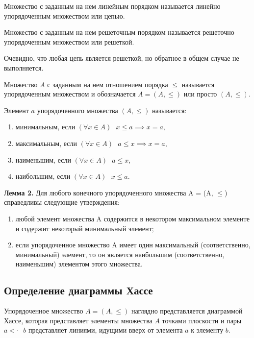 \documentclass[spec, och, labwork]{shiza}
\begin{document}
        Множество с заданным на нем линейным порядком называется линейно упорядоченным множеством или цепью.

        Множество с заданным на нем решеточным порядком называется решеточно упорядоченным множеством или решеткой.

        Очевидно, что любая цепь является решеткой, но обратное в общем случае не выполняется. 

        Множество $A$ с заданным на нем отношением порядка $\leq$ называется упорядоченным множеством и обозначается $A
        = (A, \leq)$ или просто $(A, \leq)$.

        Элемент $a$ упорядоченного множества $(A, \leq)$ называется:

        \begin{enumerate}
            \item минимальным, если $(\forall x \in A) \text{ } x \leq a \implies x = a$,
            \item максимальным, если $(\forall x \in A) \text{ } a \leq x \implies x = a$,
            \item наименьшим, если $(\forall x \in A) \text{ } a \leq x$,
            \item наибольшим, если $(\forall x \in A) \text{ } x \leq a$.
        \end{enumerate}

        \textbf{Лемма 2.} Для любого конечного упорядоченного множества
        A = (A, $\leq$) справедливы следующие утверждения:

        \begin{enumerate}

        \item любой элемент множества A содержится в некотором  максимальном элементе и содержит некоторый
        минимальный элемент;
        \item если упорядоченное множество A имеет один максимальный (соответственно, минимальный) элемент, то
        он является наибольшим (соответственно, наименьшим) элементом этого множества. 

        \end{enumerate}


    \subsection{Определение диаграммы Хассе}

        Упорядоченное множество $A = (A, \leq)$ наглядно представляется диаграммой Хассе, которая представляет элементы множества $A$ точками плоскости и пары $a <\cdot \text{ } b$ представляет линиями, идущими вверх от элемента $a$ к элементу $b$.
        
\end{document}
